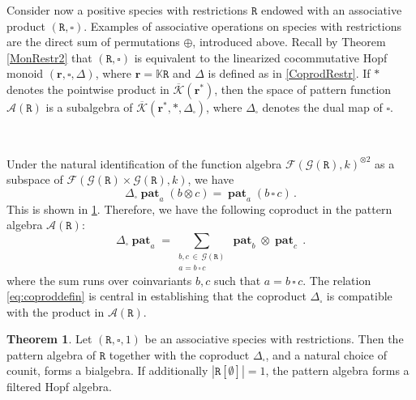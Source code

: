 \documentclass[12pt, reqno]{amsart}
\newcommand{\raul}[1]{\todo[color=green!30,inline]{CH, #1}}
\theoremstyle{definition}
\newtheorem{thm}{Theorem}[section]
\DeclareMathOperator{\pat}{\mathbf{pat}}
\newcommand{\prR}{\mathtt{R}}
\newcommand{\trr}{\mathbf{r}}
\newcommand{\Kc}{\mathcal{K}}
\newcommand{\Kcb}{\overline{\Kc}}
\newcommand{\sq}{{{\scriptstyle{\square}}}}
\begin{document}

Consider now a positive species with restrictions $\prR$ endowed with an associative product $(\prR, \sq)$. Examples of associative operations on species with restrictions are the direct sum of permutations $\oplus$, introduced above. Recall by Theorem \eqref{MonRestr2} that 
$(\prR, \sq)$ is equivalent to the linearized cocommutative Hopf monoid $(\trr, \sq, \Delta)$, where $\trr=\mathbb{K}\prR$ and $\Delta$ is defined as in \eqref{CoprodRestr}. If $*$ denotes the pointwise product in $\Kcb(\trr^*)$, then the space of pattern function $\mathcal{A}(\prR)$ is a subalgebra of $\Kcb(\trr^*, *, \Delta_{\sq})$, where $\Delta_{\sq}$ denotes the dual map of $\sq$.

\

Under the natural identification of the function algebra $\mathcal{F}(\mathcal G (\prR), k)^{\otimes 2} $ as a subspace of $\mathcal{F}(\mathcal G (\prR) \times \mathcal G (\prR), k) $, we have
\begin{equation}\label{eq:coproddefin}
 \Delta_{\sq} \pat_a (b \otimes  c) =  \pat_a (b \,\sq\, c) \, .
\end{equation}
This is shown in \cref{thm:conHopfalgebra}. Therefore, we have the following coproduct in the pattern algebra $\mathcal A (\prR)$:
\begin{equation}\label{eq:coprodformula}
\Delta_{\sq} \pat_ a = \sum_{\substack{ b, c \, \in \, \mathcal G (\prR) \\ a = b \, \sq \, c}} \pat_b \otimes \pat_c \, .
\end{equation}
where the sum runs over coinvariants $b, c$ such that $a = b \,\sq \,c$. 
The relation \eqref{eq:coproddefin} is central in establishing that the coproduct $\Delta_{\sq} $ is compatible with the product in $\mathcal A (\prR)$.


\begin{thm}\label{thm:conHopfalgebra}
Let $(\prR, \sq, 1) $ be an associative species with restrictions.
Then the pattern algebra of $\prR$ together with the coproduct $\Delta_{\sq}$, and a natural choice of counit, forms a bialgebra.
If additionally $| \prR[\emptyset ] | = 1 $, the pattern algebra forms a filtered Hopf algebra.
\end{thm}

\end{document}

